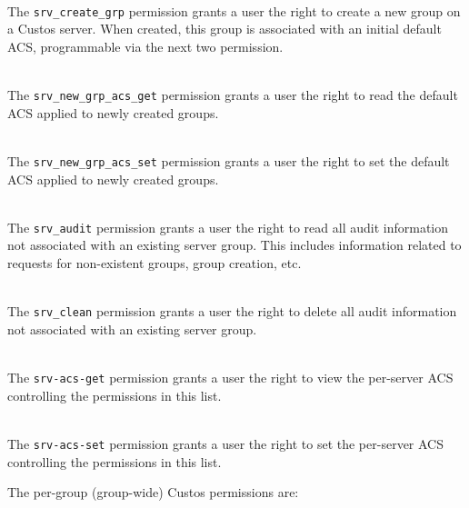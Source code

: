 \begin{packed_desc}
\item[\texttt{srv\_create\_grp}] \hfill \\ The
  \texttt{srv\_create\_grp} permission grants a user the right to
  create a new group on a Custos server. When created, this group is
  associated with an initial default ACS, programmable via the next
  two permission.
\item[\texttt{srv\_new\_grp\_acs\_get}] \hfill \\ The
  \texttt{srv\_new\_grp\_acs\_get} permission grants a user the right
    to read the default ACS applied to newly created groups.
\item[\texttt{srv\_new\_grp\_acs\_set}] \hfill \\ The
  \texttt{srv\_new\_grp\_acs\_set} permission grants a user the right
  to set the default ACS applied to newly created groups.
\item[\texttt{srv\_audit}] \hfill \\ The \texttt{srv\_audit}
  permission grants a user the right to read all audit information not
  associated with an existing server group. This includes information
  related to requests for non-existent groups, group creation, etc.
\item[\texttt{srv\_clean}] \hfill \\ The \texttt{srv\_clean}
  permission grants a user the right to delete all audit information
  not associated with an existing server group.
\item[\texttt{srv-acs-get}] \hfill \\ The \texttt{srv-acs-get}
  permission grants a user the right to view the per-server ACS
  controlling the permissions in this list.
\item[\texttt{srv-acs-set}] \hfill \\ The \texttt{srv-acs-set}
  permission grants a user the right to set the per-server ACS
  controlling the permissions in this list.
\end{packed_desc}

\noindent
The per-group (group-wide) Custos permissions are:

